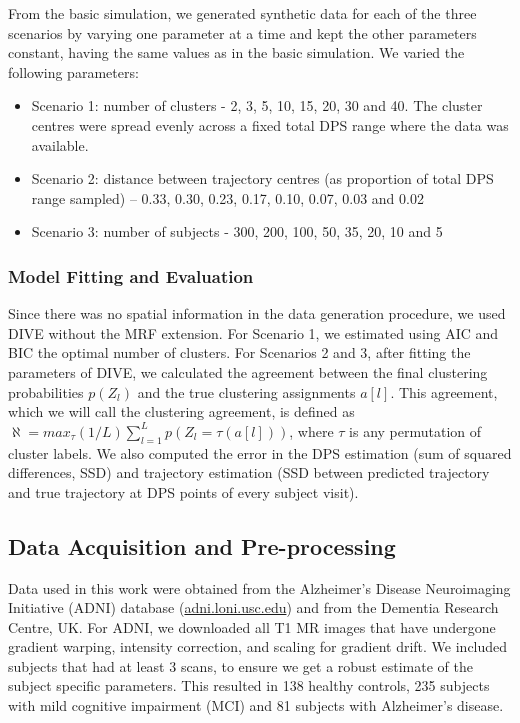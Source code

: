 From the basic simulation, we generated synthetic data for each of the three scenarios by varying one parameter at a time and kept the other parameters constant, having the same values as in the basic simulation. We varied the following parameters:
\begin{itemize}
 \item Scenario 1: number of clusters - 2, 3, 5, 10, 15, 20, 30 and 40. The cluster centres were spread evenly across a fixed total DPS range where the data was available. 
 \item Scenario 2: distance between trajectory centres (as proportion of total DPS range sampled) -- 0.33, 0.30, 0.23, 0.17, 0.10, 0.07, 0.03 and 0.02 
 \item Scenario 3: number of subjects - 300, 200, 100, 50, 35, 20, 10 and 5
\end{itemize}


\subsubsection{Model Fitting and Evaluation}

Since there was no spatial information in the data generation procedure, we used DIVE without the MRF extension. For Scenario 1, we estimated using AIC and BIC the optimal number of clusters. For Scenarios 2 and 3, after fitting the parameters of DIVE, we calculated the agreement between the final clustering probabilities $p(Z_l)$ and the true clustering assignments $a[l]$. This agreement, which we will call the clustering agreement, is defined as $\aleph = max_{\tau} (1/L) \sum_{l=1}^L p(Z_l = \tau(a[l]))$, where $\tau$ is any permutation of cluster labels. We also computed the error in the DPS estimation (sum of squared differences, SSD) and trajectory estimation (SSD between predicted trajectory and true trajectory at DPS points of every subject visit). 

\subsection{Data Acquisition and Pre-processing}
\label{sec:diveDataAcquis}

Data used in this work were obtained from the Alzheimer's Disease Neuroimaging Initiative (ADNI) database (\url{adni.loni.usc.edu}) and from the Dementia Research Centre, UK. For ADNI, we downloaded all T1 MR images that have undergone gradient warping, intensity correction, and scaling for gradient drift. We included subjects that had at least 3 scans, to ensure we get a robust estimate of the subject specific parameters. This resulted in 138 healthy controls, 235 subjects with mild cognitive impairment (MCI) and 81 subjects with Alzheimer's disease. 

